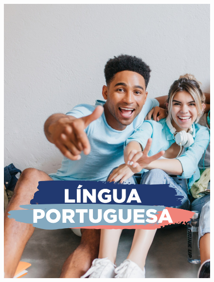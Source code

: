 \blankpage
\begin{figure}[htpb]
\vspace*{-2.5cm}
\hspace*{-2.5cm}\includegraphics[height=\paperheight]{../separadores/separadorPOR9A.png}
\end{figure}
\pagebreak
